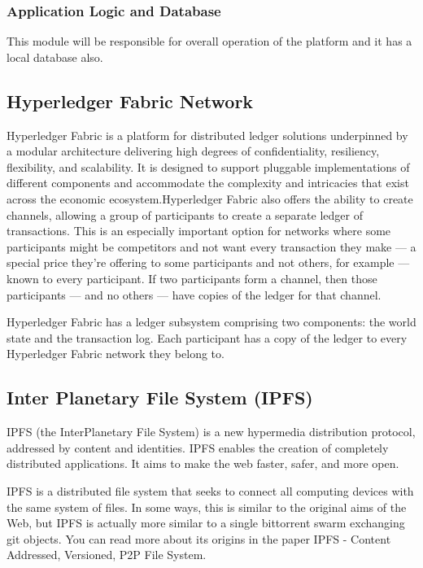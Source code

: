 \documentclass[11pt]{report}
\begin{document}
\subsubsection{Application Logic and Database}
This module will be responsible for overall operation of the platform and it has a local database also.

\subsection{Hyperledger Fabric Network}
Hyperledger Fabric is a platform for distributed ledger solutions underpinned by a modular architecture delivering high degrees of confidentiality, resiliency, flexibility, and scalability. It is designed to support pluggable implementations of different components and accommodate the complexity and intricacies that exist across the economic ecosystem.Hyperledger Fabric also offers the ability to create channels, allowing a group of participants to create a separate ledger of transactions. This is an especially important option for networks where some participants might be competitors and not want every transaction they make — a special price they’re offering to some participants and not others, for example — known to every participant. If two participants form a channel, then those participants — and no others — have copies of the ledger for that channel.
\par Hyperledger Fabric has a ledger subsystem comprising two components: the world state and the transaction log. Each participant has a copy of the ledger to every Hyperledger Fabric network they belong to.

\subsection{Inter Planetary File System (IPFS) }
IPFS (the InterPlanetary File System) is a new hypermedia distribution protocol, addressed by content and identities. IPFS enables the creation of completely distributed applications. It aims to make the web faster, safer, and more open.
\par IPFS is a distributed file system that seeks to connect all computing devices with the same system of files. In some ways, this is similar to the original aims of the Web, but IPFS is actually more similar to a single bittorrent swarm exchanging git objects. You can read more about its origins in the paper IPFS - Content Addressed, Versioned, P2P File System.
\end{document}
